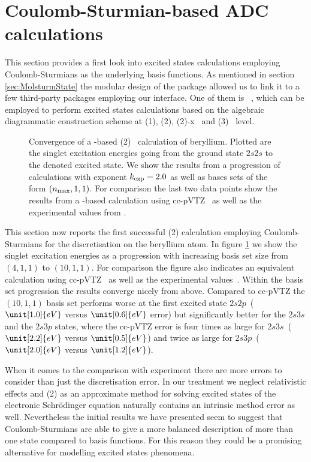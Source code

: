\section{Coulomb-Sturmian-based ADC calculations}
This section provides a first look into excited states calculations
employing Coulomb-Sturmians as the underlying basis functions.
As mentioned in section \vref{sec:MolsturmState} the modular design
of the \molsturm package allowed us to link it to a few third-party
packages employing our \python interface.
One of them is \adcman~\cite{Wormit2014},
which can be employed to perform excited states calculations
based on the algebraic diagrammatic construction scheme at
{\ADC}(1), {\ADC}(2), {\ADC}(2)-x~\cite{Schirmer1982}
and {\ADC}(3)~\cite{Trofimov1999} level.

\begin{figure}
	\centering
	\caption[
		Convergence of a \CS-based {\ADC}(2) calculation of beryllium
	]{
		Convergence of a \CS-based {\ADC}(2)~\cite{Schirmer1982}
		calculation of beryllium.
		Plotted are the singlet excitation energies
		going from the ground state $2s2s$ to the denoted excited state.
		We show the results from a progression
		of \CS calculations with exponent $k_\text{exp} = 2.0$
		as well as bases sets of the form $(n_\text{max}, 1, 1)$.
		For comparison the last two data points
		show the results from a \cGTO-based calculation
		using cc-pVTZ~\cite{Prascher2011}
		as well as the experimental values from \citet{Moore1949}.
	}
	\label{fig:KoptVsAtnum}
\end{figure}
This section now reports the first successful {\ADC}(2)
calculation employing Coulomb-Sturmians for the discretisation
on the beryllium atom.
In figure \ref{fig:KoptVsAtnum} we show the singlet excitation energies
as a progression with increasing \CS basis set size from $(4,1,1)$ to $(10,1,1)$.
For comparison the figure also indicates an equivalent calculation
using cc-pVTZ~\cite{Prascher2011} as well as the experimental values~\cite{Moore1949}.
Within the \CS basis set progression the results converge nicely from above.
Compared to cc-pVTZ the $(10,1,1)$ basis set
performs worse at the first excited state $2s2p$~($\unit[1.0]{eV}$ versus $\unit[0.6]{eV}$ error) but significantly better for the $2s3s$ and the $2s3p$ states,
where the cc-pVTZ error is four times as large
for $2s3s$~($\unit[2.2]{eV}$ versus $\unit[0.5]{eV}$)
and twice as large for $2s3p$~($\unit[2.0]{eV}$ versus $\unit[1.2]{eV}$).

When it comes to the comparison with experiment there are more
errors to consider than just the discretisation error.
In our treatment we neglect relativistic effects
and {\ADC}(2) as an approximate method for solving excited states
of the electronic Schrödinger equation naturally contains
an intrinsic method error as well.
Nevertheless the initial results we have presented
seem to suggest that Coulomb-Sturmians
are able to give a more balanced description of more than one state
compared to \cGTO basis functions.
For this reason they could be a promising alternative
for modelling excited states phenomena.



